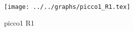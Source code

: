 \begin{figure}[h] \centering\texttt{[image: ../../graphs/picco1\_R1.tex]}\caption{picco1 R1}\label{gr:picco1_R1} \end{figure}
